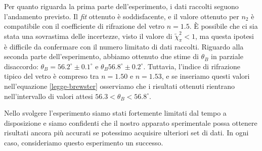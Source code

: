 Per quanto riguarda la prima parte dell'esperimento, i dati raccolti seguono l'andamento
previsto. Il \emph{fit} ottenuto è soddisfacente, e
il valore ottenuto per $n_2$ è compatibile con il coefficiente di rifrazione del
vetro $n = 1.5$.
È possibile che ci sia stata una sovrastima delle incertezze, visto il valore di
$\tilde \chi^2_\pi < 1$, ma questa ipotesi è difficile da confermare con il numero
limitato di dati raccolti.
Riguardo alla seconda parte dell'esperimento, abbiamo ottenuto due stime di
$\theta_B$ in parziale disaccordo: $\theta_B = 56.2^\circ \pm 0.1^\circ$ e $\theta_B 56.8^\circ \pm 0.2^\circ$.
Tuttavia, l'indice di rifrazione tipico del vetro è compreso tra $n=1.50$ e $n=1.53$, e se
inseriamo questi valori nell'equazione \eqref{legge-brewster} osserviamo che i risultati
ottenuti rientrano nell'intervallo di valori attesi $56.3 < \theta_{B} < 56.8^\circ$.

Nello svolgere l'esperimento siamo stati fortemente limitati dal tempo a disposizione
e siamo confidenti che il nostro apparato sperimentale possa ottenere risultati ancora
più accurati se potessimo acquisire ulteriori set di dati. In ogni caso, consideriamo
questo esperimento un successo.
\endinput

